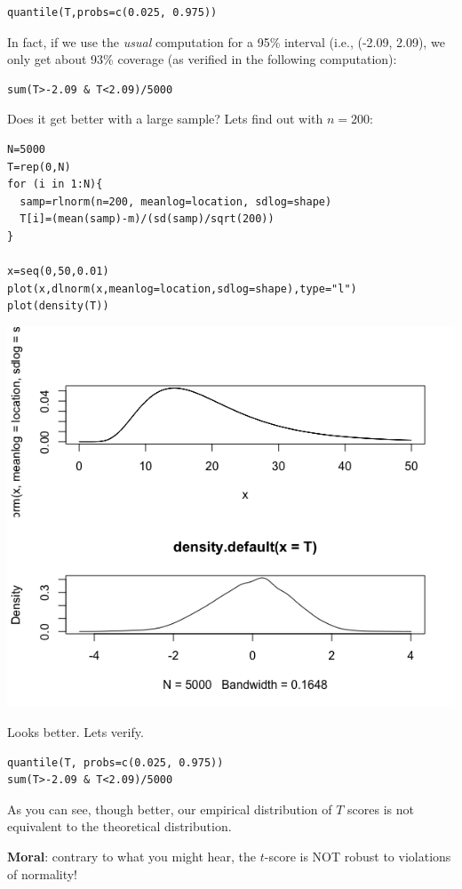 \documentclass[11pt]{article}
\begin{document}
\begin{verbatim}
quantile(T,probs=c(0.025, 0.975))
\end{verbatim}

In fact, if we use the \emph{usual} computation for a 95\% interval (i.e., (-2.09, 2.09), we only get about 93\% coverage (as verified in the following computation):

\begin{verbatim}
sum(T>-2.09 & T<2.09)/5000
\end{verbatim}


Does it get better with a large sample?  Lets find out with $n=200$:

\begin{verbatim}
N=5000
T=rep(0,N)
for (i in 1:N){
  samp=rlnorm(n=200, meanlog=location, sdlog=shape)
  T[i]=(mean(samp)-m)/(sd(samp)/sqrt(200))
}

x=seq(0,50,0.01)
plot(x,dlnorm(x,meanlog=location,sdlog=shape),type="l")
plot(density(T))
\end{verbatim}

\includegraphics[width=.9\linewidth]{figures/week3/lognormal2.png}

Looks better.  Lets verify.

\begin{verbatim}
quantile(T, probs=c(0.025, 0.975))
sum(T>-2.09 & T<2.09)/5000
\end{verbatim}

As you can see, though better, our empirical distribution of $T$ scores is not equivalent to the theoretical distribution.

\textbf{Moral}: contrary to what you might hear, the $t$-score is NOT robust to violations of normality!
\end{document}
